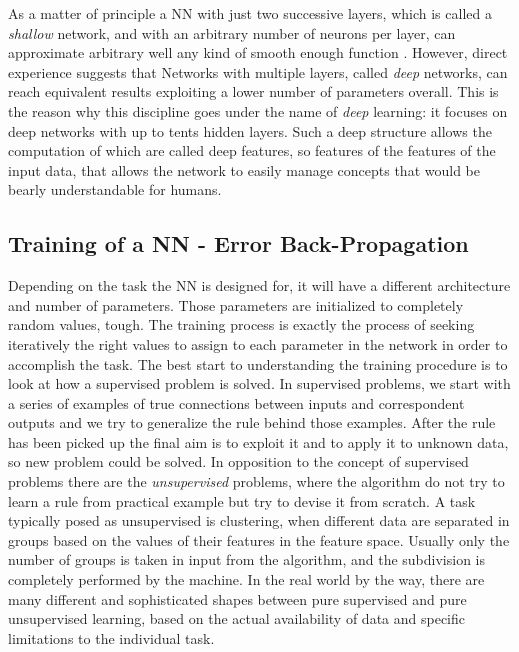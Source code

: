 As a matter of principle a NN with just two successive layers, which is called a \textit{shallow} network, and with an arbitrary number of neurons per layer, can approximate arbitrary well any kind of smooth enough function \cite{pinkus_1999}. However, direct experience suggests that Networks with multiple layers, called \textit{deep} networks, can reach equivalent results exploiting a lower number of parameters overall. This is the reason why this discipline goes under the name of \textit{deep} learning: it focuses on deep networks with up to tents hidden layers. Such a deep structure allows the computation of which are called deep features, so features of the features of the input data, that allows the network to easily manage concepts that would be bearly understandable for humans.

\subsection{Training of a NN -  Error Back-Propagation}
Depending on the task the NN is designed for, it will have a different architecture and number of parameters. Those parameters are initialized to completely random values, tough. The training process is exactly the process of seeking iteratively the right values to assign to each parameter in the network in order to accomplish the task. The best start to understanding the training procedure is to look at how a supervised problem is solved. In supervised problems, we start with a series of examples of true connections between inputs and correspondent outputs and we try to generalize the rule behind those examples. After the rule has been picked up the final aim is to exploit it and to apply it to unknown data, so new problem could be solved. In opposition to the concept of supervised problems there are the \textit{unsupervised} problems, where the algorithm do not try to learn a rule from practical example but try to devise it from scratch. A task typically posed as unsupervised is clustering, when different data are separated in groups based on the values of their features in the feature space. Usually only the number of groups is taken in input from the algorithm, and the subdivision is completely performed by the machine. In the real world by the way, there are many different and sophisticated shapes between pure supervised and pure unsupervised learning, based on the actual availability of data and specific limitations to the individual task.

